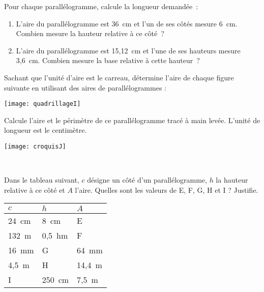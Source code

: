 \begin{exercice}
Pour chaque parallélogramme, calcule la longueur demandée :
\begin{enumerate}
 \item L'aire du parallélogramme est 36 cm et l'un de ses côtés mesure 6 cm. Combien mesure la hauteur relative à ce côté ?
 \item L'aire du parallélogramme est 15,12 cm et l'une de ses hauteurs mesure 3,6 cm. Combien mesure la base relative à cette hauteur ?
 \end{enumerate}
\end{exercice}


\begin{exercice}
Sachant que l'unité d'aire est le carreau, détermine l'aire de chaque figure suivante en utilisant des aires de parallélogrammes :

\begin{center} \texttt{[image: quadrillageI]} \end{center}
\end{exercice}


\begin{exercice}
\begin{minipage}[c]{0.48\linewidth}
Calcule l'aire et le périmètre de ce parallélogramme tracé à main levée. L'unité de longueur est le centimètre.
 \end{minipage} \hfill%
 \begin{minipage}[c]{0.48\linewidth}
\begin{center} \texttt{[image: croquisJ]} \end{center} 
  \end{minipage} \\
\end{exercice}


\begin{exercice}
Dans le tableau suivant, $c$ désigne un côté d'un parallélogramme, $h$ la hauteur relative à ce côté et $A$ l'aire. Quelles sont les valeurs de E, F, G, H et I ? Justifie.

\begin{tabularx}{\linewidth}{|X|X|X|}
\hline
$c$ & $h$ & $A$ \\\hline
24 cm & 8 cm & E \\\hline
132 m & 0,5 hm & F \\\hline
16 mm & G & 64 mm\up{2} \\\hline
4,5 m & H & 14,4 m\up{2} \\\hline
I & 250 cm & 7,5 m\up{2} \\\hline
 \end{tabularx} \\
\end{exercice}


